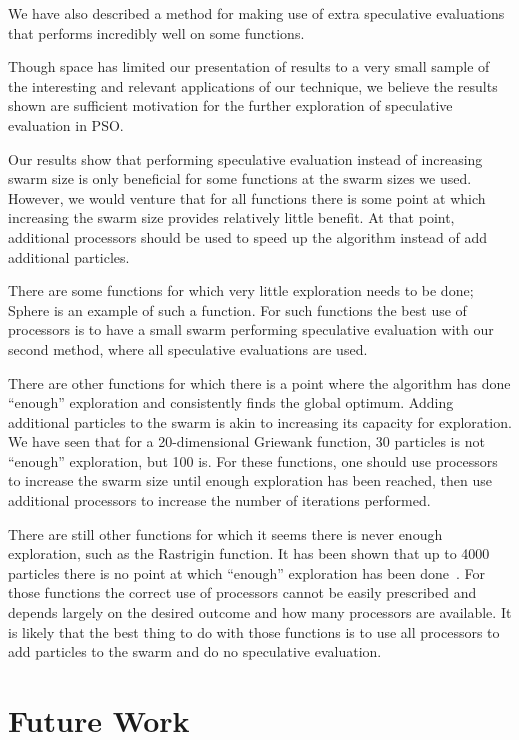 \documentclass[letterpaper]{sig-alt-release2}
\begin{document}
We have also described a method for making use of extra speculative evaluations
that performs incredibly well on some functions.

Though space has limited our presentation of results to a very small sample of
the interesting and relevant applications of our technique, we believe the
results shown are sufficient motivation for the further exploration of
speculative evaluation in PSO.

Our results show that performing speculative evaluation instead of increasing
swarm size is only beneficial for some functions at the swarm sizes we used.
However, we would venture that for all functions there is some point at which
increasing the swarm size provides relatively little benefit.  At that point,
additional processors should be used to speed up the algorithm instead of add
additional particles.

There are some functions for which very little exploration needs to be done;
Sphere is an example of such a function.  For such functions the best use of
processors is to have a small swarm performing speculative evaluation with our
second method, where all speculative evaluations are used.

There are other functions for which there is a point where the algorithm has
done ``enough'' exploration and consistently finds the global optimum.  Adding
additional particles to the swarm is akin to increasing its capacity for
exploration.  We have seen that for a 20-dimensional Griewank function, 30
particles is not ``enough'' exploration, but 100 is.  For these functions, one
should use processors to increase the swarm size until enough exploration has
been reached, then use additional processors to increase the number of
iterations performed.

There are still other functions for which it seems there is never enough
exploration, such as the Rastrigin function.  It has been shown that up to 4000
particles there is no point at which ``enough'' exploration has been
done~\cite{mcnabb-cec09}.  For those functions the correct use of processors
cannot be easily prescribed and depends largely on the desired outcome and how
many processors are available.  It is likely that the best thing to do with
those functions is to use all processors to add particles to the swarm and do
no speculative evaluation.

\section{Future Work}
\label{sec:future}
\end{document}
